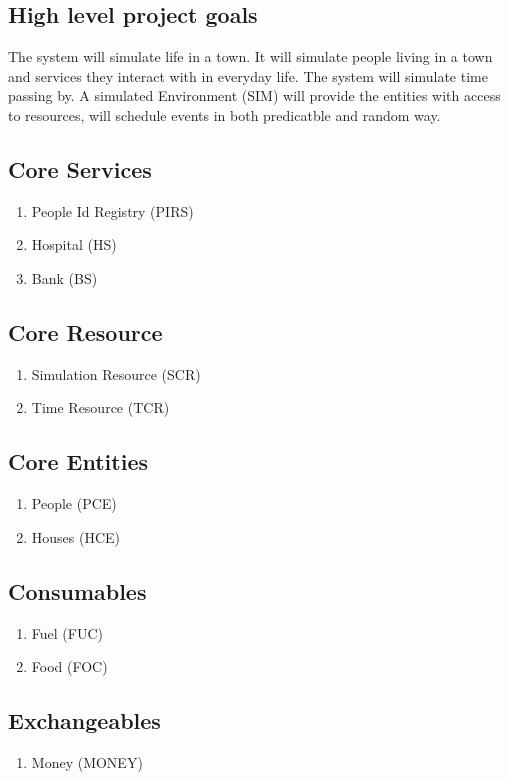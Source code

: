 \subsection{High level project goals} 
The system will simulate life in a town. It will simulate people living in a town and services they interact with in everyday life. 
The system will simulate time passing by. A simulated Environment (SIM) will provide the entities with access to resources, will schedule events in both predicatble and random way.

\subsection{Core Services} 
\begin{enumerate}
\item People Id Registry (PIRS)
\item Hospital (HS)
\item Bank (BS)
\end{enumerate}

\subsection{Core Resource} 
\begin{enumerate}
\item Simulation Resource (SCR)
\item Time Resource (TCR)
\end{enumerate}

\subsection{Core Entities} 
\begin{enumerate}
\item People (PCE)
\item Houses (HCE)
\end{enumerate}

\subsection{Consumables} 
\begin{enumerate}
\item Fuel (FUC)
\item Food (FOC)
\end{enumerate}

\subsection{Exchangeables} 
\begin{enumerate}
\item Money (MONEY)
\end{enumerate}


